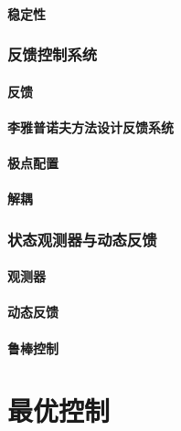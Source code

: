 \documentclass[
12pt, %
a4paper, 
oneside, %
headinclude,footinclude, %
]{scrartcl}
\begin{document}
\subsection[稳定性]{稳定性}
\section{反馈控制系统}
\subsection[反馈]{反馈}
\subsection[李雅普诺夫方法设计反馈系统]{李雅普诺夫方法设计反馈系统}
\subsection[极点配置]{极点配置}
\subsection[解耦]{解耦}
\section{状态观测器与动态反馈}
\subsection[观测器]{观测器}
\subsection[动态反馈]{动态反馈}
\subsection[鲁棒控制]{鲁棒控制}
\part{最优控制}
\end{document}
